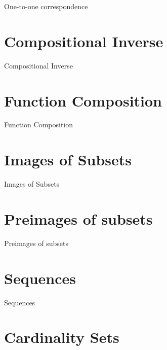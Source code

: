 One-to-one correspondence

\section{Compositional Inverse}
\label{sec:compositional-inverse}

Compositional Inverse

\section{Function Composition}
\label{sec:function-composition}

Function Composition

\section{Images of Subsets}
\label{sec:images-of-subsets}

Images of Subsets

\section{Preimages of subsets}
\label{sec:preimages-of-subsets}

Preimages of subsets

\section{Sequences}
\label{sec:sequences}

Sequences

\section{Cardinality Sets}
\label{sec:cardinality-sets}

